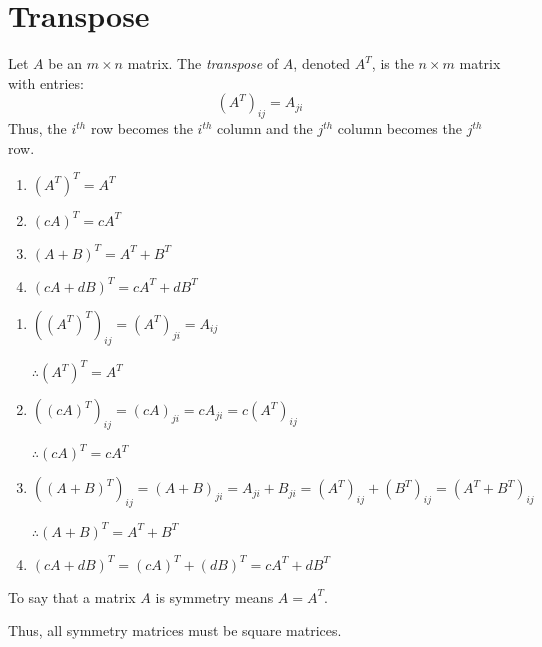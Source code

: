 \documentclass[letterpaper,12pt,fleqn]{article}
\begin{document}
\section*{Transpose}

\begin{definition}[Transpose]
  Let $A$ be an $m\times n$ matrix. The \emph{transpose} of $A$, denoted $A^T$,
  is the $n\times m$ matrix with entries:
  \[(A^T)_{ij}=A_{ji}\]
  Thus, the $i^{th}$ row becomes the $i^{th}$ column and the $j^{th}$ column
  becomes the $j^{th}$ row.
\end{definition}

\begin{theorem}
  \listbreak
  \begin{enumerate}
  \item $(A^T)^T=A^T$
  \item $(cA)^T=cA^T$
  \item $(A+B)^T=A^T+B^T$
  \item $(cA+dB)^T=cA^T+dB^T$
  \end{enumerate}
\end{theorem}

\begin{theproof}
  \listbreak
  \begin{enumerate}
  \item

    $((A^T)^T)_{ij}=(A^T)_{ji}=A_{ij}$

    $\therefore (A^T)^T=A^T$

  \item

    $((cA)^T)_{ij}=(cA)_{ji}=cA_{ji}=c(A^T)_{ij}$

    $\therefore (cA)^T=cA^T$

  \item

    $((A+B)^T)_{ij}=(A+B)_{ji}=A_{ji}+B_{ji}=(A^T)_{ij}+(B^T)_{ij}=(A^T+B^T)_{ij}$

    $\therefore (A+B)^T=A^T+B^T$

  \item

    $(cA+dB)^T=(cA)^T+(dB)^T=cA^T+dB^T$
  \end{enumerate}
\end{theproof}

\begin{definition}[Symmetric]
  To say that a matrix $A$ is symmetry means $A=A^T$.

  Thus, all symmetry matrices must be square matrices.
\end{definition}
\end{document}
